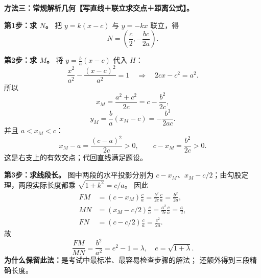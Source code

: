 \clearpage
\begin{proofbox}
\textbf{方法三：常规解析几何【写直线＋联立求交点＋距离公式】。}

\begin{center}\end{center}

\textbf{第1步：求 $N$。}
把 $y=k(x-c)$ 与 $y=-kx$ 联立，得
\[
\boxed{N=\left(\frac c2,-\frac{bc}{2a}\right)}.
\]

\textbf{第2步：求 $M$。}
将 $y=\tfrac ba(x-c)$ 代入 $H$：
\[
\frac{x^2}{a^2}-\frac{(x-c)^2}{a^2}=1
\quad\Longrightarrow\quad
2cx-c^2=a^2.
\]
所以
\[
\boxed{x_M=\frac{a^2+c^2}{2c}
=c-\frac{b^2}{2c}},
\]
\[
\boxed{y_M=\frac ba(x_M-c)=-\frac{b^3}{2ac}}.
\]
并且 $a<x_M<c$：
\[
x_M-a=\frac{(c-a)^2}{2c}>0,
\qquad c-x_M=\frac{b^2}{2c}>0.
\]
这是右支上的有效交点；代回直线满足题设。

\textbf{第3步：求线段长。}
图中两段的水平投影分别为 $c-x_M$、$x_M-c/2$；由勾股定理，两段实际长度都乘 $\sqrt{1+k^2}=c/a$。
因此
\[
\begin{aligned}
FM&=(c-x_M)\frac ca
=\frac{b^2}{2c}\frac ca=\boxed{\frac{b^2}{2a}},\\[3pt]
MN&=(x_M-c/2)\frac ca
=\frac{a^2}{2c}\frac ca=\boxed{\frac a2},\\[3pt]
FN&=(c-c/2)\frac ca=\boxed{\frac{c^2}{2a}}.
\end{aligned}
\]
故
\[
\boxed{\frac{FM}{MN}=\frac{b^2}{a^2}
=e^2-1=\lambda},\quad
\boxed{e=\sqrt{1+\lambda}}.
\]
\textbf{为什么保留此法：}是考试中最标准、最容易检查步骤的解法；
还额外得到三段精确长度。
\end{proofbox}

